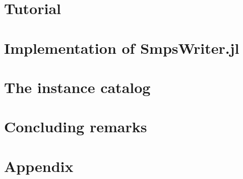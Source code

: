 \section{Tutorial}\label{sec:tutorial}

\pagebreak

\section{Implementation of SmpsWriter.jl}\label{sec:smps_writer}

\pagebreak

\section{The instance catalog}\label{sec:solution}

\pagebreak

\section{Concluding remarks}

\pagebreak


\appendix
\section*{Appendix}






